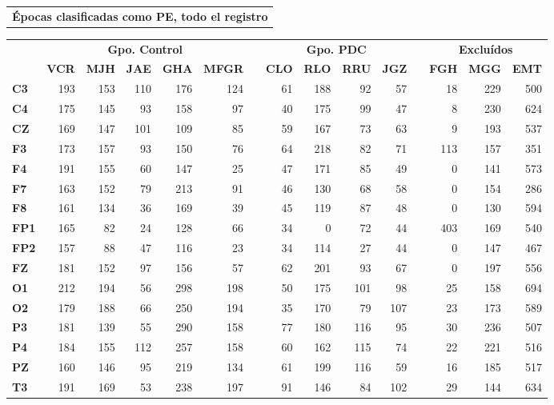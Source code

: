 \documentclass[12pt,a4paper]{mitthesis}
\begin{document}
\begin{SidewaysTable}
\centering
\begin{tabular}{c}
\textbf{\'Epocas clasificadas como PE, todo el registro}
\vspace{1em}
\end{tabular}
\begin{tabular}{lrrrrrcrrrrcrrr}
\toprule
& \multicolumn{5}{c}{\textbf{Gpo. Control}} && 
  \multicolumn{4}{c}{\textbf{Gpo. PDC}} && 
  \multicolumn{3}{c}{\textbf{Exclu\'idos}}\\
\cmidrule{2-6} \cmidrule{8-11} \cmidrule{13-15}
& \textbf{VCR} & \textbf{MJH} & \textbf{JAE} & \textbf{GHA} & \textbf{MFGR} & \phantom{l}
& \textbf{CLO} & \textbf{RLO} & \textbf{RRU} & \textbf{JGZ} & \phantom{l}
& \textbf{FGH} & \textbf{MGG} & \textbf{EMT} \\
\midrule
\textbf{C3} &193&153&110&176&124&&61 &188&92 &57 &&18&229&500 \\
\textbf{C4} &175&145&93 &158&97 &&40 &175&99 &47 &&8&230&624 \\
\textbf{CZ} &169&147&101&109&85 &&59 &167&73 &63 &&9&193&537 \\
\rowcolor{gris}
\textbf{F3} &173&157&93 &150&76 &&64 &218&82 &71 &&113&157&351 \\
\rowcolor{gris}
\textbf{F4} &191&155&60 &147&25 &&47 &171&85 &49 &&0&141&573 \\
\rowcolor{gris}
\textbf{F7} &163&152&79 &213&91 &&46 &130&68 &58 &&0&154&286 \\
\rowcolor{gris}
\textbf{F8} &161&134&36 &169&39 &&45 &119&87 &48 &&0&130&594 \\
\textbf{FP1}&165&82 &24 &128&66 &&34 &0  &72 &44 &&403&169&540 \\
\textbf{FP2}&157&88 &47 &116&23 &&34 &114&27 &44 &&0&147&467 \\
\textbf{FZ} &181&152&97 &156&57 &&62 &201&93 &67 &&0&197&556 \\
\rowcolor{gris}
\textbf{O1} &212&194&56 &298&198&&50 &175&101&98 &&25&158&694 \\
\rowcolor{gris}
\textbf{O2} &179&188&66 &250&194&&35 &170&79 &107&&23&173&589 \\
\textbf{P3} &181&139&55 &290&158&&77 &180&116&95 &&30&236&507 \\
\textbf{P4} &184&155&112&257&158&&60 &162&115&74 &&22&221&516 \\
\textbf{PZ} &160&146&95 &219&134&&61 &199&116&59 &&16&185&517 \\
\rowcolor{gris}
\textbf{T3} &191&169&53 &238&197&&91 &146&84 &102&&29&144&634 \\

\end{tabular}
\end{SidewaysTable}
\end{document}
